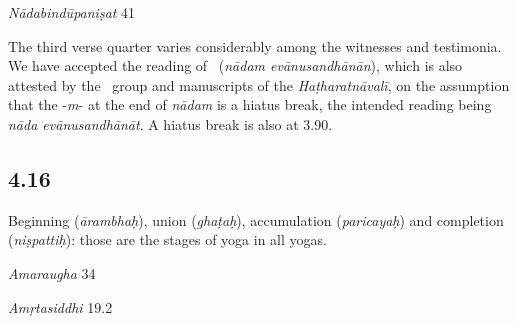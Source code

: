 \begin{ekdosis}
\begin{testimonia}[hp04_015]
\emph{Nādabindūpaniṣat} 41
\begin{versinnote}
\end{versinnote}
\end{testimonia}

\begin{philcomm}[hp04_015]

The third verse quarter varies considerably among the witnesses and testimonia. We have accepted the reading of \alphaOne\ (\emph{nādam evānusandhānān}), which is also attested by the \textbeta\ group and manuscripts of the \emph{Haṭharatnāvalī}, on the assumption that the -\emph{m}- at the end of \emph{nādam} is a hiatus break, the intended reading being \textit{nāda evānusandhānāt}. A hiatus break is also at 3.90.
\end{philcomm}

\subsection*{4.16}
\begin{translation}[hp04_016]
Beginning (\emph{ārambhaḥ}), union (\emph{ghaṭaḥ}), accumulation (\emph{paricayaḥ}) and completion (\emph{niṣpattiḥ}): those are the stages of yoga in all yogas.
\end{translation}

\begin{sources}[hp04_016]
\emph{Amaraugha} 34
\begin{versinnote}
\end{versinnote}

\emph{Amṛtasiddhi} 19.2
\begin{versinnote}
\end{versinnote}


\end{sources}
\end{ekdosis}
